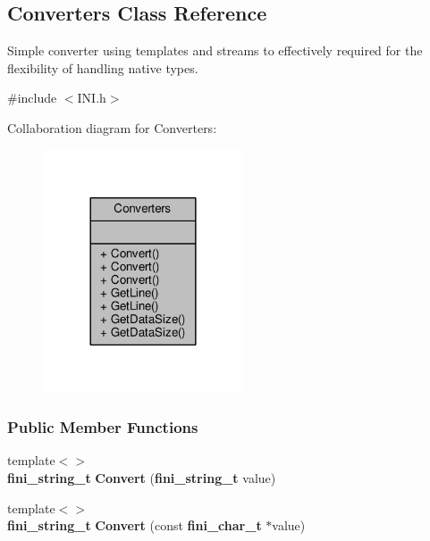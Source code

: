 \subsection{Converters Class Reference}
\label{classConverters}


Simple converter using templates and streams to effectively required for the flexibility of handling native types.  




{\ttfamily \#include $<$I\+N\+I.\+h$>$}



Collaboration diagram for Converters\+:
\nopagebreak
\begin{figure}[H]
\begin{center}
\leavevmode
\includegraphics[width=168pt]{db/d21/classConverters__coll__graph}
\end{center}
\end{figure}
\subsubsection*{Public Member Functions}
\begin{DoxyCompactItemize}
\item 
{\footnotesize template$<$$>$ }\\{\bf fini\+\_\+string\+\_\+t} {\bf Convert} ({\bf fini\+\_\+string\+\_\+t} value)
\item 
{\footnotesize template$<$$>$ }\\{\bf fini\+\_\+string\+\_\+t} {\bf Convert} (const {\bf fini\+\_\+char\+\_\+t} $\ast$value)
\end{DoxyCompactItemize}
